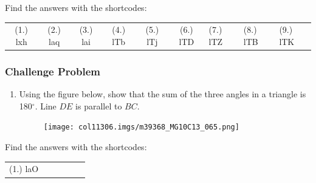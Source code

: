       \label{m39368*uid132}
\par {} Find the answers with the shortcodes:
 \par \begin{tabular}[h]{cccccc}
 (1.) lxh  &  (2.) laq  &  (3.) lai  &  (4.) lTb  &  (5.) lTj  &  (6.) lTD  &  (7.) lTZ  &  (8.) lTB  &  (9.) lTK  & \end{tabular}
            \subsubsection{ Challenge Problem}
            \nopagebreak
        \label{m39368*id320611}\begin{enumerate}[noitemsep, label=\textbf{\arabic*}. ] 
            \label{m39368*uid133}\item Using the figure below, show that the sum of the three angles in a triangle is 180${}^{\circ }$. Line $DE$\hspace{1ex} is parallel to $BC$.
    \setcounter{subfigure}{0}
	\begin{figure}[H] %
    \begin{center}
    \label{m39368*id320668!!!underscore!!!media}\label{m39368*id320668!!!underscore!!!printimage}\texttt{[image: col11306.imgs/m39368\_MG10C13\_065.png]} %
      \vspace{2pt}
    \vspace{.1in}
    \end{center}
 \end{figure}       \newline
            \end{enumerate}
  \label{m39368**end}
  \label{8eb3a75df362978731c03bbeab266515**end}
\par {} Find the answers with the shortcodes:
 \par \begin{tabular}[h]{cccccc}
 (1.) laO  & \end{tabular}
